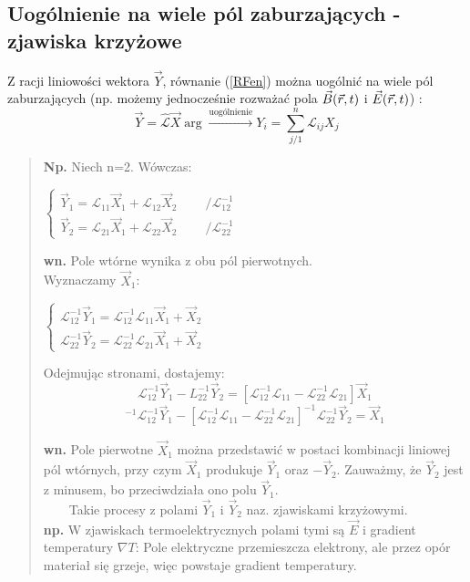 \subsection{Uogólnienie na wiele pól zaburzających - zjawiska krzyżowe}
Z racji liniowości wektora $\vec{Y}$, równanie (\ref{RFen}) można uogólnić na wiele pól zaburzających (np. możemy jednocześnie rozważać pola $\vec{B}(\vec{r},t)$ i $\vec{E}(\vec{r},t)$) :
\begin{equation} \vec{Y}=\hat{\mathcal{L}}\vec{X} \arg 
\stackrel{\text{uogólnienie}}{\longrightarrow}  {Y}_i=\sum_{j/1}^n \mathcal{L}_{ij} X_j \end{equation}
\begin{verse} \textbf{Np.} Niech n=2. Wówczas:
\begin{center} 
$\begin{cases} \vec{Y}_1=\mathcal{L}_{11}\vec{X}_1+\mathcal{L}_{12}\vec{X}_2 ~~~~~~~~~~/\mathcal{L}_{12}^{-1}\\ \vec{Y}_2=\mathcal{L}_{21}\vec{X}_1+\mathcal{L}_{22}\vec{X}_2 ~~~~~~~~~~/\mathcal{L}_{22}^{-1}
\end{cases}$
\end{center}

\textbf{wn.} Pole wtórne wynika z obu pól pierwotnych.\\
Wyznaczamy $\vec{X}_1$:
\begin{center}
$\begin{cases} \mathcal{L}_{12}^{-1}\vec{Y}_1=\mathcal{L}_{12}^{-1}\mathcal{L}_{11}\vec{X}_1+\vec{X}_2 \\ \mathcal{L}_{22}^{-1}\vec{Y}_2=\mathcal{L}_{22}^{-1}\mathcal{L}_{21}\vec{X}_1+\vec{X}_2 
\end{cases}$
\end{center}
Odejmując stronami, dostajemy:
\begin{equation} \mathcal{L}_{12}^{-1}\vec{Y}_1 - {L}_{22}^{-1}\vec{Y}_2 = [\mathcal{L}_{12}^{-1}\mathcal{L}_{11} - \mathcal{L}_{22}^{-1}\mathcal{L}_{21}]\vec{X}_1 \nonumber \end{equation}
\begin{equation} 
 [\mathcal{L}_{12}^{-1}\mathcal{L}_{11}-\mathcal{L}_{22}^{-1}\mathcal{L}_{21}]^{-1} \mathcal{L}_{12}^{-1}\vec{Y}_1 -   
 [\mathcal{L}_{12}^{-1}\mathcal{L}_{11} - \mathcal{L}_{22}^{-1}\mathcal{L}_{21}]^{-1} \mathcal{L}_{22}^{-1}\vec{Y}_2 =\vec{X}_1  \nonumber \end{equation}
 
\textbf{wn.} Pole pierwotne $\vec{X}_1$ można przedstawić w postaci kombinacji liniowej pól wtórnych, przy czym $\vec{X}_1$ produkuje $\vec{Y}_1$ oraz $-\vec{Y}_2$. Zauważmy, że $\vec{Y}_2$ jest z minusem, bo przeciwdziała ono polu $\vec{Y}_1$.\\ ~~~~Takie procesy z polami $\vec{Y}_1$ i $\vec{Y}_2$ naz. zjawiskami krzyżowymi.\\
\textbf{np.} W zjawiskach termoelektrycznych polami tymi są $\vec{E}$ i gradient temperatury $\nabla T$: Pole elektryczne przemieszcza elektrony, ale przez opór materiał się grzeje, więc powstaje gradient temperatury.
\end{verse}
